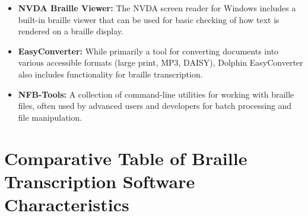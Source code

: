 \begin{itemize}
	\item \textbf{NVDA Braille Viewer:} The NVDA screen reader for Windows includes a built-in braille viewer that can be used for basic checking of how text is rendered on a braille display.
	\item \textbf{EasyConverter:} While primarily a tool for converting documents into various accessible formats (large print, MP3, DAISY), Dolphin EasyConverter also includes functionality for braille transcription.
	\item \textbf{NFB-Tools:} A collection of command-line utilities for working with braille files, often used by advanced users and developers for batch processing and file manipulation.
\end{itemize}

\section{Comparative Table of Braille Transcription Software Characteristics}
\label{sec:comparative-table-of-braille-transcription-software-characteristics}

